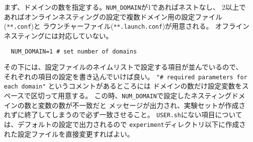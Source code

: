 まず、ドメインの数を指定する。\verb|NUM_DOMAIN|が1であればネストなし、
2以上であればオンラインネスティングの設定で複数ドメイン用の設定ファイル(\verb|**.conf|)と
ラウンチャーファイル(\verb|**.launch.conf|)が用意される。
オフラインネスティングには対応していない。
\begin{verbatim}
  NUM_DOMAIN=1 # set number of domains
\end{verbatim}

その下には、設定ファイルのネイムリストで設定する項目が並んでいるので、
それぞれの項目の設定を書き込んでいけば良い。
\verb|"# required parameters for each domain"| というコメントがあるところには
ドメインの数だけ設定変数をスペースで区切って用意する。
この時、\verb|NUM_DOMAIN|で設定したネスティングドメインの数と変数の数が不一致だと
メッセージが出力され、実験セットが作成されずに終了してしまうので必ず一致させること。
\verb|USER.sh|にない項目については、デフォルトの設定で出力されるので
\verb|experiment|ディレクトリ以下に作成された設定ファイルを直接変更すればよい。

